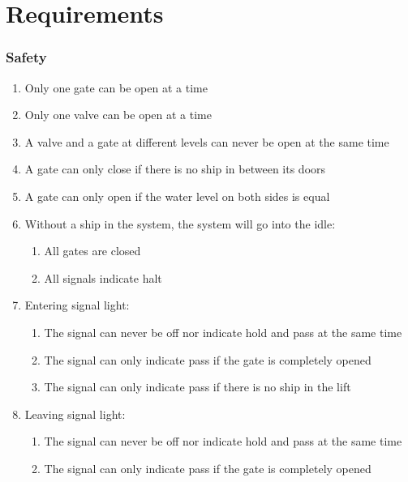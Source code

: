 \section{Requirements}
\subsubsection*{Safety}
\begin{enumerate}
	\item Only one gate can be open at a time
	\item Only one valve can be open at a time
	\item A valve and a gate at different levels can never be open at the same time
	\item A gate can only close if there is no ship in between its doors
	\item A gate can only open if the water level on both sides is equal
	\item Without a ship in the system, the system will go into the idle:
	\begin{enumerate}
		\item All gates are closed
		\item All signals indicate halt
	\end{enumerate}
	\item Entering signal light:
	\begin{enumerate}
		\item The signal can never be off nor indicate hold and pass at the same time
		\item The signal can only indicate pass if the gate is completely opened
		\item The signal can only indicate pass if there is no ship in the lift
	\end{enumerate}
	\item Leaving signal light:
	\begin{enumerate}
		\item The signal can never be off nor indicate hold and pass at the same time
		\item The signal can only indicate pass if the gate is completely opened
	\end{enumerate}
\end{enumerate}
	
